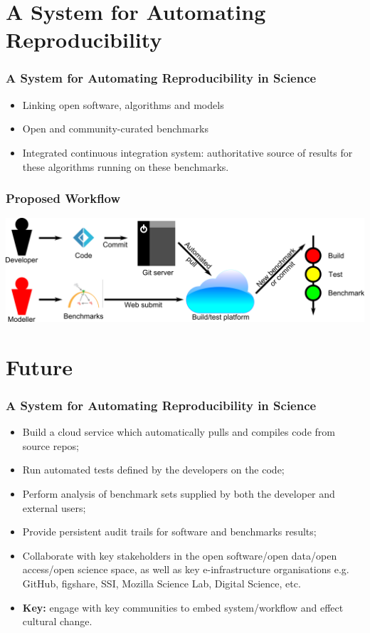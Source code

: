 \documentclass[pdftex]{beamer}
\begin{document}
\section{A System for Automating Reproducibility}

\begin{frame}
\frametitle{A System for Automating Reproducibility in Science}
\begin{itemize}
\item Linking open software, algorithms and models
\item Open and community-curated benchmarks
\item Integrated continuous integration system: authoritative source of results for these algorithms running on these benchmarks.
\end{itemize}
\end{frame}

\begin{frame}
\frametitle{Proposed Workflow}
\begin{center}
\includegraphics[width=0.9\paperwidth]{workflow.png}
\end{center}
\end{frame}

\section{Future}

\begin{frame}
\frametitle{A System for Automating Reproducibility in Science}
{\small{\begin{itemize}
\item Build a cloud service which automatically pulls and compiles code from source repos;
\item Run automated tests defined by the developers on the code;
\item Perform analysis of benchmark sets supplied by both the developer and external users;
\item Provide persistent audit trails for software and benchmarks
  results;
\item Collaborate with key stakeholders in the open software/open
  data/open access/open science space, as well as key e-infrastructure
  organisations e.g. GitHub, figshare, SSI, Mozilla Science Lab,
  Digital Science, etc.
\item {\textbf{Key:}} engage with key communities to embed system/workflow and effect
  cultural change.
\end{itemize}}}
\end{frame}
\end{document}
